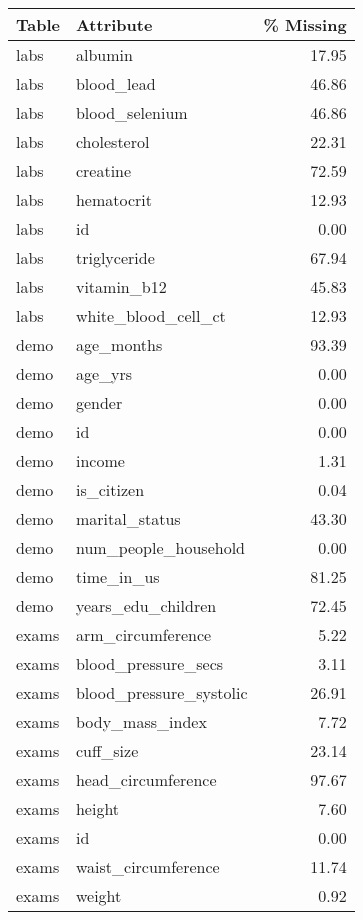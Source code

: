 \begin{tabular}{llr}
\toprule
 Table &                Attribute &  \% Missing \\
\midrule
  labs &                  albumin &      17.95 \\
  labs &               blood\_lead &      46.86 \\
  labs &           blood\_selenium &      46.86 \\
  labs &              cholesterol &      22.31 \\
  labs &                 creatine &      72.59 \\
  labs &               hematocrit &      12.93 \\
  labs &                       id &       0.00 \\
  labs &             triglyceride &      67.94 \\
  labs &              vitamin\_b12 &      45.83 \\
  labs &      white\_blood\_cell\_ct &      12.93 \\
  demo &               age\_months &      93.39 \\
  demo &                  age\_yrs &       0.00 \\
  demo &                   gender &       0.00 \\
  demo &                       id &       0.00 \\
  demo &                   income &       1.31 \\
  demo &               is\_citizen &       0.04 \\
  demo &           marital\_status &      43.30 \\
  demo &     num\_people\_household &       0.00 \\
  demo &               time\_in\_us &      81.25 \\
  demo &       years\_edu\_children &      72.45 \\
 exams &        arm\_circumference &       5.22 \\
 exams &      blood\_pressure\_secs &       3.11 \\
 exams &  blood\_pressure\_systolic &      26.91 \\
 exams &          body\_mass\_index &       7.72 \\
 exams &                cuff\_size &      23.14 \\
 exams &       head\_circumference &      97.67 \\
 exams &                   height &       7.60 \\
 exams &                       id &       0.00 \\
 exams &      waist\_circumference &      11.74 \\
 exams &                   weight &       0.92 \\
\bottomrule
\end{tabular}
